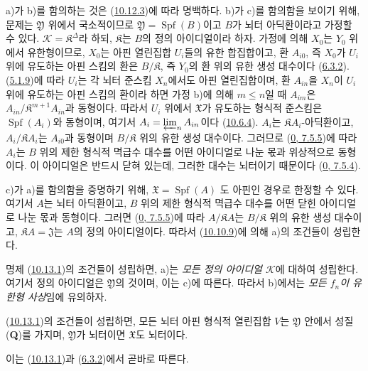 a)가 b)를 함의하는 것은 (\hyperref[I.10.12.3-ko]{10.12.3})에 따라
명백하다. b)가 c)를 함의함을 보이기 위해, 문제는 $\mathfrak{Y}$ 위에서
국소적이므로 $\mathfrak{Y}=\operatorname{Spf}(B)$이고 $B$가 뇌터
아딕환이라고 가정할 수 있다. $\mathscr{K}=\mathfrak{K}^\Delta$라
하되, $\mathfrak{K}$는 $B$의 정의 아이디얼이라 하자. 가정에 의해 $X_0$는
$Y_0$ 위에서 유한형이므로, $X_0$는 아핀 열린집합 $U_i$들의 유한
합집합이고, 환 $A_{i0}$, 즉 $X_0$가 $U_i$ 위에 유도하는 아핀
스킴의 환은 $B/\mathfrak{K}$, 즉 $Y_0$의 환 위의 유한 생성 대수이다
(\hyperref[I.6.3.2-ko]{6.3.2}).
(\hyperref[I.5.1.9-ko]{5.1.9})에 따라 $U_i$는 각 뇌터 준스킴
$X_n$에서도 아핀 열린집합이며, 환 $A_{in}$을 $X_n$이 $U_i$ 위에
유도하는 아핀 스킴의 환이라 하면 가정 b)에 의해 $m\leq n$일 때
$A_{im}$은 $A_{in}/\mathfrak{K}^{m+1}A_{in}$과 동형이다. 따라서
$U_i$ 위에서 $\mathfrak{X}$가 유도하는 형식적 준스킴은
$\operatorname{Spf}(A_i)$와 동형이며, 여기서
$A_i=\varprojlim_n A_{in}$이다 (\hyperref[I.10.6.4-ko]{10.6.4}).
$A_i$는 $\mathfrak{K}A_i$-아딕환이고, $A_i/\mathfrak{K}A_i$는
$A_{i0}$과 동형이며 $B/\mathfrak{K}$ 위의 유한 생성 대수이다.
그러므로 (\hyperref[0.7.5.5-ko]{0, 7.5.5})에 따라 $A_i$는 $B$ 위의
제한 형식적 멱급수 대수를 어떤 아이디얼로 나눈 몫과 위상적으로
동형이다. 이 아이디얼은 반드시 닫혀 있는데, 그러한 대수는 뇌터이기 때문이다
(\hyperref[0.7.5.4-ko]{0, 7.5.4}).

c)가 a)를 함의함을 증명하기 위해, $\mathfrak{X}=\operatorname{Spf}(A)$
도 아핀인 경우로 한정할 수 있다. 여기서 $A$는 뇌터 아딕환이고, $B$
위의 제한 형식적 멱급수 대수를 어떤 닫힌 아이디얼로 나눈 몫과
동형이다. 그러면 (\hyperref[0.7.5.5-ko]{0, 7.5.5})에 따라
$A/\mathfrak{K}A$는 $B/\mathfrak{K}$ 위의 유한 생성 대수이고,
$\mathfrak{K}A=\mathfrak{J}$는 $A$의 정의 아이디얼이다. 따라서
(\hyperref[I.10.10.9-ko]{10.10.9})에 의해 a)의 조건들이 성립한다.

명제 (\hyperref[I.10.13.1-ko]{10.13.1})의 조건들이 성립하면, a)는
\emph{모든 정의 아이디얼 $\mathscr{K}$}에 대하여 성립한다. 여기서
정의 아이디얼은 $\mathfrak{Y}$의 것이며, 이는 c)에 따른다. 따라서
b)에서는 \emph{모든 $f_n$이 유한형 사상}임에 유의하자.

\begin{corollary}[10.13.2]
\label{I.10.13.2-ko}
(\hyperref[I.10.13.1-ko]{10.13.1})의 조건들이 성립하면, 모든 뇌터
아핀 형식적 열린집합 $V$는 $\mathfrak{Y}$ 안에서 성질
(\textbf{Q})를 가지며, $\mathfrak{Y}$가 뇌터이면 $\mathfrak{X}$도
뇌터이다.
\end{corollary}

이는 (\hyperref[I.10.13.1-ko]{10.13.1})과
(\hyperref[I.6.3.2-ko]{6.3.2})에서 곧바로 따른다.

